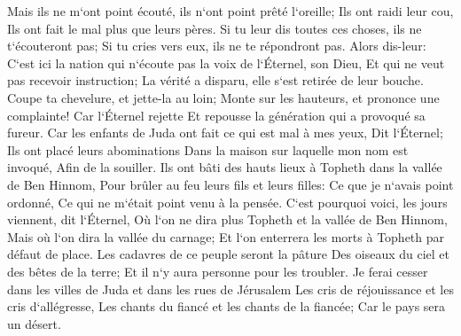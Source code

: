 \verse Mais ils ne m`ont point écouté, ils n`ont point prêté l`oreille; Ils ont raidi leur cou, Ils ont fait le mal plus que leurs pères. 
\verse Si tu leur dis toutes ces choses, ils ne t`écouteront pas; Si tu cries vers eux, ils ne te répondront pas. 
\verse Alors dis-leur: C`est ici la nation qui n`écoute pas la voix de l`Éternel, son Dieu, Et qui ne veut pas recevoir instruction; La vérité a disparu, elle s`est retirée de leur bouche. 
\verse Coupe ta chevelure, et jette-la au loin; Monte sur les hauteurs, et prononce une complainte! Car l`Éternel rejette Et repousse la génération qui a provoqué sa fureur. 
\verse Car les enfants de Juda ont fait ce qui est mal à mes yeux, Dit l`Éternel; Ils ont placé leurs abominations Dans la maison sur laquelle mon nom est invoqué, Afin de la souiller. 
\verse Ils ont bâti des hauts lieux à Topheth dans la vallée de Ben Hinnom, Pour brûler au feu leurs fils et leurs filles: Ce que je n`avais point ordonné, Ce qui ne m`était point venu à la pensée. 
\verse C`est pourquoi voici, les jours viennent, dit l`Éternel, Où l`on ne dira plus Topheth et la vallée de Ben Hinnom, Mais où l`on dira la vallée du carnage; Et l`on enterrera les morts à Topheth par défaut de place. 
\verse Les cadavres de ce peuple seront la pâture Des oiseaux du ciel et des bêtes de la terre; Et il n`y aura personne pour les troubler. 
\verse Je ferai cesser dans les villes de Juda et dans les rues de Jérusalem Les cris de réjouissance et les cris d`allégresse, Les chants du fiancé et les chants de la fiancée; Car le pays sera un désert. 

